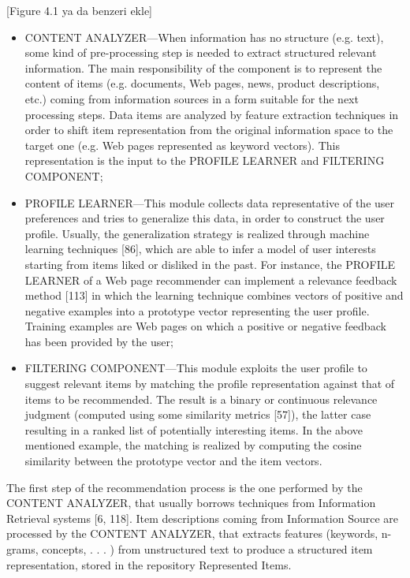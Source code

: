 [Figure 4.1 ya da benzeri ekle]

\begin{itemize}
\item CONTENT ANALYZER—When information has no structure (e.g. text), some kind of pre-processing step is needed to extract structured relevant information. The main responsibility of the component is to represent the content of items (e.g. documents, Web pages, news, product descriptions, etc.) coming from information sources in a form suitable for the next processing steps. Data items are analyzed by feature extraction techniques in order to shift item representation from the original information space to the target one (e.g. Web pages represented as keyword vectors). This representation is the input to the PROFILE LEARNER and FILTERING COMPONENT;
\item PROFILE LEARNER—This module collects data representative of the user preferences and tries to generalize this data, in order to construct the user profile. Usually, the generalization strategy is realized through machine learning techniques [86], which are able to infer a model of user interests starting from items liked or disliked in the past. For instance, the PROFILE LEARNER of a Web page recommender can implement a relevance feedback method [113] in which the learning technique combines vectors of positive and negative examples into a prototype vector representing the user profile. Training examples are Web pages on which a positive or negative feedback has been provided by the user;
\item FILTERING COMPONENT—This module exploits the user profile to suggest relevant items by matching the profile representation against that of items to be recommended. The result is a binary or continuous relevance judgment (computed using some similarity metrics [57]), the latter case resulting in a ranked list of potentially interesting items. In the above mentioned example, the matching is realized by computing the cosine similarity between the prototype vector and the item vectors.
\end{itemize}

The first step of the recommendation process is the one performed by the CONTENT ANALYZER, that usually borrows techniques from Information Retrieval systems [6, 118]. Item descriptions coming from Information Source are processed by the CONTENT ANALYZER, that extracts features (keywords, n-grams, concepts, . . . ) from unstructured text to produce a structured item representation, stored in the repository Represented Items.


